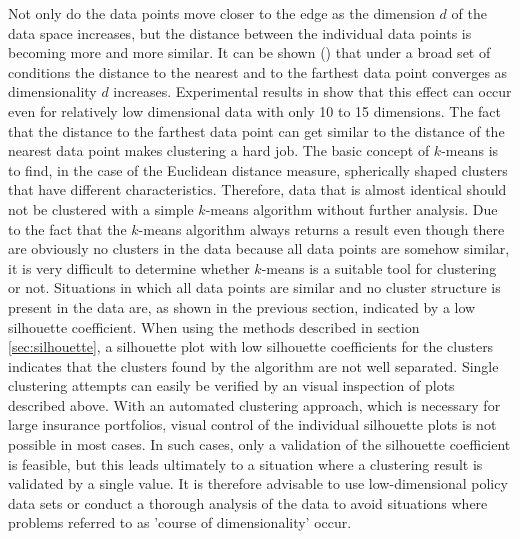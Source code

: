 Not only do the data points move closer to the edge as the dimension $d$ of the data space increases, but the distance between the individual data points is becoming more and more similar. It can be shown (\cite{beyer1999nearest}) that under a broad set of conditions the distance to the nearest and to the farthest data point converges as dimensionality $d$ increases. Experimental results in \cite{beyer1999nearest} show that this effect can occur even for relatively low dimensional data with only 10 to 15 dimensions. The fact that the distance to the farthest data point can get similar to the distance of the nearest data point makes clustering a hard job. The basic concept of $k$-means is to find, in the case of the Euclidean distance measure, spherically shaped clusters that have different characteristics. Therefore, data that is almost identical should not be clustered with a simple $k$-means algorithm without further analysis. Due to the fact that the $k$-means algorithm always returns a result even though there are obviously no clusters in the data because all data points are somehow similar, it is very difficult to determine whether $k$-means is a suitable tool for clustering or not. Situations in which all data points are similar and no cluster structure is present in the data are, as shown in the previous section, indicated by a low silhouette coefficient. When using the methods described in section \ref{sec:silhouette}, a silhouette plot with low silhouette coefficients for the clusters indicates that the clusters found by the algorithm are not well separated. Single clustering attempts can easily be verified by an visual inspection of plots described above. With an automated clustering approach, which is necessary for large insurance portfolios, visual control of the individual silhouette plots is not possible in most cases. In such cases, only a validation of the silhouette coefficient is feasible, but this leads ultimately to a situation where a clustering result is validated by a single value.
It is therefore advisable to use low-dimensional policy data sets or conduct a thorough analysis of the data to avoid situations where problems referred to as 'course of  dimensionality' occur. 







